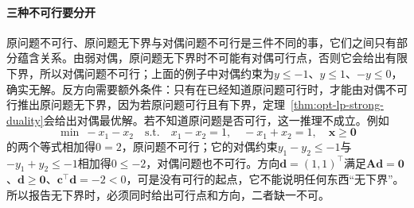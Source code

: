 \paragraph{三种不可行要分开}
原问题不可行、原问题无下界与对偶问题不可行是三件不同的事，它们之间只有部分蕴含关系。由弱对偶，原问题无下界时不可能有对偶可行点，否则它会给出有限下界，所以对偶问题不可行；上面的例子中对偶约束为$y\le-1$、$y\le1$、$-y\le0$，确实无解。反方向需要额外条件：只有在已经知道原问题可行时，才能由对偶不可行推出原问题无下界，因为若原问题可行且有下界，定理~\ref{thm:opt-lp-strong-duality}会给出对偶最优解。若不知道原问题是否可行，这一推理不成立。例如
\[
  \min\ -x_1-x_2\quad\text{s.t.}\quad x_1-x_2=1,\quad -x_1+x_2=1,\quad\bm x\ge\bm 0
\]
的两个等式相加得$0=2$，原问题不可行；它的对偶约束$y_1-y_2\le-1$与$-y_1+y_2\le-1$相加得$0\le-2$，对偶问题也不可行。方向$\bm d=(1,1)^\top$满足$\bm A\bm d=\bm 0$、$\bm d\ge\bm 0$、$\bm c^\top\bm d=-2<0$，可是没有可行的起点，它不能说明任何东西“无下界”。所以报告无下界时，必须同时给出可行点和方向，二者缺一不可。
